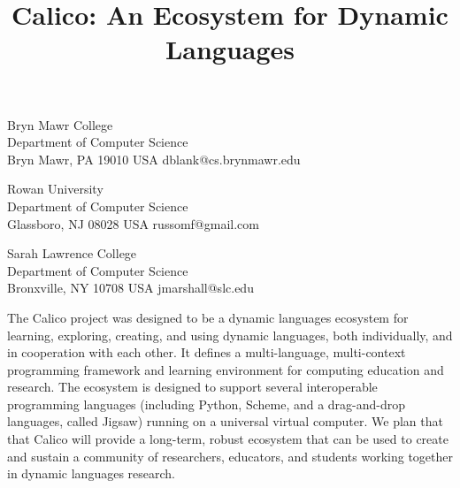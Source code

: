 \documentclass[preprint]{sigplanconf}
\begin{document}




\title{Calico: An Ecosystem for Dynamic Languages}

           {Bryn Mawr College\\Department of Computer Science\\Bryn Mawr, PA 19010 USA}
           {dblank@cs.brynmawr.edu}

           {Rowan University\\Department of Computer Science\\Glassboro, NJ 08028 USA}
           {russomf@gmail.com}

           {Sarah Lawrence College\\Department of Computer Science\\Bronxville, NY 10708 USA}
           {jmarshall@slc.edu}

\maketitle

\begin{abstract}

\end{abstract}

The Calico project was designed to be a dynamic languages ecosystem
for learning, exploring, creating, and using dynamic languages, both
individually, and in cooperation with each other. It defines a
multi-language, multi-context programming framework and learning
environment for computing education and research. The ecosystem is
designed to support several interoperable programming languages
(including Python, Scheme, and a drag-and-drop languages, called
Jigsaw) running on a universal virtual computer.  We plan that that
Calico will provide a long-term, robust ecosystem that can be used to
create and sustain a community of researchers, educators, and students
working together in dynamic languages research.
\end{document}
